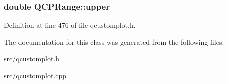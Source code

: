 \hypertarget{class_q_c_p_range_ae44eb3aafe1d0e2ed34b499b6d2e074f}{
\subsubsection[{upper}]{\setlength{\rightskip}{0pt plus 5cm}double Q\-C\-P\-Range\-::upper}}\label{class_q_c_p_range_ae44eb3aafe1d0e2ed34b499b6d2e074f}


Definition at line 476 of file qcustomplot.\-h.



The documentation for this class was generated from the following files\-:\begin{DoxyCompactItemize}
\item 
src/\hyperlink{qcustomplot_8h}{qcustomplot.\-h}\item 
src/\hyperlink{qcustomplot_8cpp}{qcustomplot.\-cpp}\end{DoxyCompactItemize}
